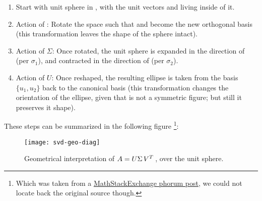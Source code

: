 \begin{enumerate}
\item Start with unit sphere in , with the unit vectors 
  and  living inside of it. 
\item Action of : Rotate the space such that  and
   become the new orthogonal basis (this transformation
  leaves the shape of the sphere intact).
\item Action of $\Sigma$: Once rotated, the unit sphere is expanded
  in the direction of  (per $\sigma_1$), and contracted in the
  direction of  (per $\sigma_2$). 
\item Action of $U$: Once reshaped, the resulting ellipse is taken
  from the basis $\{u_1,u_2\}$ back to the canonical basis (this
  transformation changes the orientation of the ellipse, given that
  is not a symmetric figure; but still it preserves it shape).
\end{enumerate}
\hfill

These steps can be summarized in the following figure \footnote{Which
  was taken from a \href{http://math.stackexchange.com/questions/243811/visualization-of-singular-value-decomposition-of-a-symmetric-matrix}{MathStackExchange phorum post}, we
  could not locate back the original source though.}: \\

\begin{figure}[h]
  \centering
  \texttt{[image: svd-geo-diag]}
  \caption{Geometrical interpretation of $A = U \Sigma \,{V}^{T}\,$,
    over the unit sphere.}
  \label{fig:svd-geo-diag}
\end{figure}
\hfill
